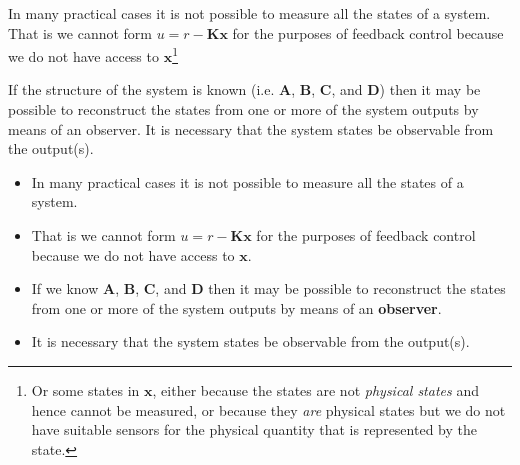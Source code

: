 \def\FileDate{10/04/02}
\def\FileVersion{1.0}

In many practical cases it is not possible to measure all the states of a system.
That is  we cannot form  $u=r-\mathbf{Kx}$  for the purposes of feedback control because we do not have access to $\mathbf{x}$\footnote{Or some states in $\mathbf{x}$, either because the states are not \emph{physical states} and hence cannot be measured, or because they \emph{are} physical states but we do not have suitable sensors for the physical quantity that is represented by the state.}

If the structure of the system is known  (i.e. $\mathbf{A}$, $\mathbf{B}$, $\mathbf{C}$, and $\mathbf{D}$) then it may be possible to reconstruct the states from one or more of the system outputs by means of an observer. It is necessary that the system states be observable from the output(s).

\ifslidesonly
\begin{slide}
   \begin{itemize}
   	\item In many practical cases it is not possible to measure all the states of a system.
   	\item That is  we cannot form  $u=r−\mathbf{Kx}$  for the purposes of feedback control because we do not have access to $\mathbf{x}$.
   	\item If we know $\mathbf{A}$, $\mathbf{B}$, $\mathbf{C}$, and $\mathbf{D}$ then it may be possible to reconstruct the states from one or more of the system outputs by means of an \textbf{observer}. 
   	\item It is necessary that the system states be observable from the output(s).
   \end{itemize}
\end{slide}
\fi

